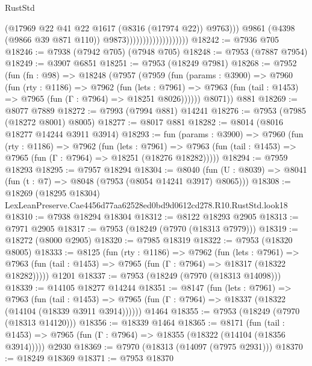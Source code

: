 \begin{lexlean}{RustStd}
\begin{coremodule}
                                              (@17969
                                                @22
                                                @41
                                                @22
                                                @1617
                                                (@8316 (@17974 @22))
                                                @9763)))
                                          @9861
                                          (@4398 (@9866 @39 @871 @110))
                                          @9873)))))))))))))))))))
@18242 := @7936 @705
@18246 := @7938 (@7942 @705) (@7948 @705)
@18248 := @7953 (@7887 @7954)
@18249 := @3907 @6851
@18251 := @7953 (@18249 @7981)
@18268 := @7952
    (fun (fn : @98) =>
    @18248
      (@7957
        (@7959
          (fun (params : @3900) =>
          @7960
            (fun (rty : @1186) =>
            @7962
              (fun (lets : @7961) =>
              @7963 (fun (tail : @1453) => @7965 (fun (Γ : @7964) => @18251 @8026))))))
        @8071))
    @881
@18269 := @8077 @7889
@18272 := @7993 (@7994 @881) @14241
@18276 := @7953 (@7985 (@18272 @8001) @8005)
@18277 := @8017 @881
@18282 := @8014 (@8016 @18277 @14244 @3911 @3914)
@18293 := fun (params : @3900) =>
  @7960
    (fun (rty : @1186) =>
    @7962
      (fun (lets : @7961) =>
      @7963 (fun (tail : @1453) => @7965 (fun (Γ : @7964) => @18251 (@18276 @18282)))))
@18294 := @7959 @18293
@18295 := @7957 @18294
@18304 := @8040
    (fun (U : @8039) => @8041 (fun (t : @7) => @8048 (@7953 (@8054 @14241 @3917) @8065)))
@18308 := @18269
    (@18295 @18304)
    LexLeanPreserve.Cae4456d77aa62528ed0bd9d0612cd278.R10.RustStd.look18
@18310 := @7938 @18294 @18304
@18312 := @8122 @18293 @2905
@18313 := @7971 @2905
@18317 := @7953 (@18249 (@7970 (@18313 @7979)))
@18319 := @18272 (@8000 @2905)
@18320 := @7985 @18319
@18322 := @7953 (@18320 @8005)
@18333 := @8125
    (fun (rty : @1186) =>
    @7962
      (fun (lets : @7961) =>
      @7963 (fun (tail : @1453) => @7965 (fun (Γ : @7964) => @18317 (@18322 @18282)))))
    @1201
@18337 := @7953 (@18249 (@7970 (@18313 @14098)))
@18339 := @14105 @18277 @14244
@18351 := @8147
    (fun (lets : @7961) =>
    @7963
      (fun (tail : @1453) =>
      @7965 (fun (Γ : @7964) => @18337 (@18322 (@14104 (@18339 @3911 @3914))))))
    @1464
@18355 := @7953 (@18249 (@7970 (@18313 @14120)))
@18356 := @18339 @1464
@18365 := @8171
    (fun (tail : @1453) => @7965 (fun (Γ : @7964) => @18355 (@18322 (@14104 (@18356 @3914)))))
    @2930
@18369 := @7970 (@18313 (@14097 (@7975 @2931)))
@18370 := @18249 @18369
@18371 := @7953 @18370

\end{coremodule}
\end{lexlean}
